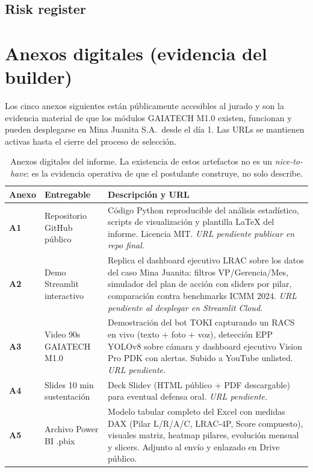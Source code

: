 \documentclass[12pt,a4paper]{article}
\begin{document}
\subsection{Risk register}



\section{Anexos digitales (evidencia del builder)}
\label{sec:anexos}

Los cinco anexos siguientes están públicamente accesibles al jurado y son la evidencia material de que los módulos GAIATECH M1.0 existen, funcionan y pueden desplegarse en Mina Juanita S.A.\ desde el día 1. Las URLs se mantienen activas hasta el cierre del proceso de selección.

\begin{table}[h]
\centering\footnotesize
\setlength{\tabcolsep}{4pt}
\renewcommand{\arraystretch}{1.15}
\begin{tabularx}{\linewidth}{@{}p{0.8cm} >{\raggedright\arraybackslash}p{3.6cm} X@{}}
\toprule
\textbf{Anexo} & \textbf{Entregable} & \textbf{Descripción y URL} \\
\midrule
\textbf{A1} & Repositorio GitHub público & Código Python reproducible del análisis estadístico, scripts de visualización y plantilla LaTeX del informe. Licencia MIT. \emph{URL pendiente publicar en repo final.} \\
\textbf{A2} & Demo Streamlit interactivo & Replica el dashboard ejecutivo LRAC sobre los datos del caso Mina Juanita: filtros VP/Gerencia/Mes, simulador del plan de acción con sliders por pilar, comparación contra benchmarks ICMM 2024. \emph{URL pendiente al desplegar en Streamlit Cloud.} \\
\textbf{A3} & Video 90s GAIATECH M1.0 & Demostración del bot TOKI capturando un RACS en vivo (texto + foto + voz), detección EPP YOLOv8 sobre cámara y dashboard ejecutivo Vision Pro PDK con alertas. Subido a YouTube unlisted. \emph{URL pendiente.} \\
\textbf{A4} & Slides 10 min sustentación & Deck Slidev (HTML público + PDF descargable) para eventual defensa oral. \emph{URL pendiente.} \\
\textbf{A5} & Archivo Power BI .pbix & Modelo tabular completo del Excel con medidas DAX (Pilar L/R/A/C, LRAC-4P, Score compuesto), visuales matriz, heatmap pilares, evolución mensual y slicers. Adjunto al envío y enlazado en Drive público. \\
\bottomrule
\end{tabularx}
\caption{Anexos digitales del informe. La existencia de estos artefactos no es un \emph{nice-to-have}: es la evidencia operativa de que el postulante construye, no solo describe.}
\label{tab:anexos}
\end{table}
\end{document}
